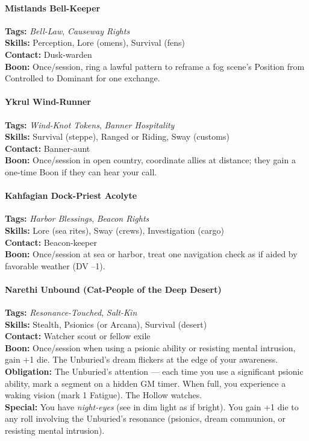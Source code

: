 \paragraph{Mistlands Bell-Keeper}
\textbf{Tags:} \textit{Bell-Law}, \textit{Causeway Rights} \\
\textbf{Skills:} Perception, Lore (omens), Survival (fens) \\
\textbf{Contact:} Dusk-warden \\
\textbf{Boon:} Once/session, ring a lawful pattern to reframe a fog scene's Position from Controlled to Dominant for one exchange.

\paragraph{Ykrul Wind-Runner}
\textbf{Tags:} \textit{Wind-Knot Tokens}, \textit{Banner Hospitality} \\
\textbf{Skills:} Survival (steppe), Ranged or Riding, Sway (customs) \\
\textbf{Contact:} Banner-aunt \\
\textbf{Boon:} Once/session in open country, coordinate allies at distance; they gain a one-time Boon if they can hear your call.

\paragraph{Kahfagian Dock-Priest Acolyte}
\textbf{Tags:} \textit{Harbor Blessings}, \textit{Beacon Rights} \\
\textbf{Skills:} Lore (sea rites), Sway (crews), Investigation (cargo) \\
\textbf{Contact:} Beacon-keeper \\
\textbf{Boon:} Once/session at sea or harbor, treat one navigation check as if aided by favorable weather (DV --1).

\paragraph{Narethi Unbound (Cat-People of the Deep Desert)} 
\textbf{Tags:} \textit{Resonance-Touched}, \textit{Salt-Kin} \\
\textbf{Skills:} Stealth, Psionics (or Arcana), Survival (desert) \\
\textbf{Contact:} Watcher scout or fellow exile \\
\textbf{Boon:} Once/session when using a psionic ability or resisting mental intrusion, gain +1 die. The Unburied's dream flickers at the edge of your awareness. \\
\textbf{Obligation:} The Unburied's attention --- each time you use a significant psionic ability, mark a segment on a hidden GM timer. When full, you experience a waking vision (mark 1 Fatigue). The Hollow watches. \\
\textbf{Special:} You have \textit{night-eyes} (see in dim light as if bright). You gain +1 die to any roll involving the Unburied's resonance (psionics, dream communion, or resisting mental intrusion).


